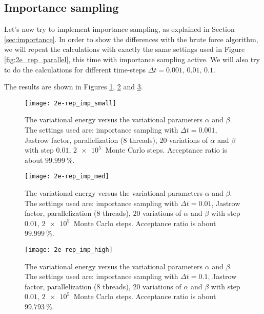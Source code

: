 \subsection{Importance sampling}
Let's now try to implement importance sampling, as explained in Section \ref{sec:importance}. In order to show the differences with the brute force algorithm, we will repeat the calculations with exactly the same settings used in Figure \ref{fig:2e_rep_parallel}, this time with importance sampling active. We will also try to do the calculations for different time-steps $\Delta t = 0.001,\,0.01,\,0.1$.

The results are shown in Figures \ref{fig:2e-rep_imp_small}, \ref{fig:2e-rep_imp_med} and \ref{fig:2e-rep_imp_high}.

\begin{figure}%
	\centering
	\texttt{[image: 2e-rep\_imp\_small]}
	\caption{The variational energy versus the variational parameters $\alpha$ and $\beta$. The settings used are: importance sampling with $\Delta t = 0.001$, Jastrow factor, parallelization (8 threads), $20$ variations of $\alpha$ and $\beta$ with step $0.01$, $\SI{2e5}{}$ Monte Carlo steps. Acceptance ratio is about $\SI{99.999}{\percent}$.}
	\label{fig:2e-rep_imp_small}
\end{figure}
\begin{figure}%
	\centering
	\texttt{[image: 2e-rep\_imp\_med]}
	\caption{The variational energy versus the variational parameters $\alpha$ and $\beta$. The settings used are: importance sampling with $\Delta t = 0.01$, Jastrow factor, parallelization (8 threads), $20$ variations of $\alpha$ and $\beta$ with step $0.01$, $\SI{2e5}{}$ Monte Carlo steps. Acceptance ratio is about $\SI{99.999}{\percent}$.}
	\label{fig:2e-rep_imp_med}
\end{figure}
\begin{figure}%
	\centering
	\texttt{[image: 2e-rep\_imp\_high]}
	\caption{The variational energy versus the variational parameters $\alpha$ and $\beta$. The settings used are: importance sampling with $\Delta t = 0.1$, Jastrow factor, parallelization (8 threads), $20$ variations of $\alpha$ and $\beta$ with step $0.01$, $\SI{2e5}{}$ Monte Carlo steps. Acceptance ratio is about $\SI{99.793}{\percent}$.}
	\label{fig:2e-rep_imp_high}
\end{figure}

